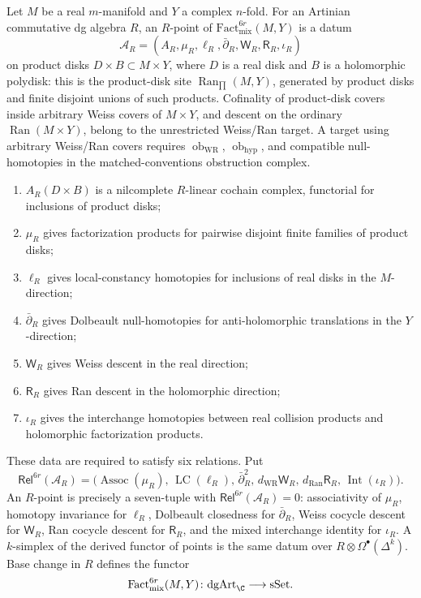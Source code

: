 \begin{defn}\label{defn:mixed-dunn-fact6r-datum}
  Let \(M\) be a real \(m\)-manifold and \(Y\) a complex \(n\)-fold.  For
  an Artinian commutative dg algebra \(R\), an \(R\)-point of
  \(\mathrm{Fact}^{6r}_{\mathrm{mix}}(M,Y)\) is a datum
  \[
    \mathcal A_R=
    (A_R,\mu_R,\ell_R,\bar\partial_R,\mathsf W_R,\mathsf R_R,\iota_R)
  \]
  on product disks \(D\times B\subset M\times Y\), where \(D\) is a
  real disk and \(B\) is a holomorphic polydisk:
  this is the product-disk site
  \(\operatorname{Ran}_{\prod}(M,Y)\), generated by product disks and
  finite disjoint unions of such products.  Cofinality of product-disk
  covers inside arbitrary Weiss covers of \(M\times Y\), and descent
  on the ordinary \(\operatorname{Ran}(M\times Y)\), belong to the
  unrestricted Weiss/Ran target.  A target using arbitrary Weiss/Ran covers requires
  \(\operatorname{ob}_{\mathrm{WR}}\),
  \(\operatorname{ob}_{\mathrm{hyp}}\), and compatible
  null-homotopies in the matched-conventions obstruction complex.
  \begin{enumerate}[label=(\roman*)]
    \item \(A_R(D\times B)\) is a nilcomplete \(R\)-linear cochain
      complex, functorial for inclusions of product disks;
    \item \(\mu_R\) gives factorization products for pairwise disjoint
      finite families of product disks;
    \item \(\ell_R\) gives local-constancy homotopies for inclusions of
      real disks in the \(M\)-direction;
    \item \(\bar\partial_R\) gives Dolbeault null-homotopies for
      anti-holomorphic translations in the \(Y\)-direction;
    \item \(\mathsf W_R\) gives Weiss descent in the real direction;
    \item \(\mathsf R_R\) gives Ran descent in the holomorphic direction;
    \item \(\iota_R\) gives the interchange homotopies between real
      collision products and holomorphic factorization products.
  \end{enumerate}
  These data are required to satisfy six relations.  Put
  \[
  \mathsf{Rel}^{6r}(\mathcal A_R)=
  \bigl(
    \operatorname{Assoc}(\mu_R),\,
    \operatorname{LC}(\ell_R),\,
    \bar\partial_R^2,\,
    d_{\mathrm{WR}}\mathsf W_R,\,
    d_{\mathrm{Ran}}\mathsf R_R,\,
    \operatorname{Int}(\iota_R)
  \bigr).
  \]
  An \(R\)-point is precisely a seven-tuple with
  \(\mathsf{Rel}^{6r}(\mathcal A_R)=0\): associativity of \(\mu_R\),
  homotopy invariance for \(\ell_R\), Dolbeault closedness for
  \(\bar\partial_R\), Weiss cocycle descent for \(\mathsf W_R\), Ran
  cocycle descent for \(\mathsf R_R\), and the mixed interchange
  identity for \(\iota_R\).  A \(k\)-simplex of the
  derived functor of points is the same datum over
  \(R\otimes\Omega^\bullet(\Delta^k)\).  Base change in \(R\) defines
  the functor
  \[
    \mathrm{Fact}^{6r}_{\mathrm{mix}}(M,Y)\colon
    \mathrm{dgArt}_\C\longrightarrow\mathrm{sSet}.
  \]


\end{defn}
